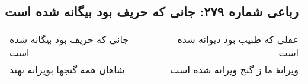 \begin{center}
\section*{رباعی شماره ۲۷۹: جانی که حریف بود بیگانه شده است}
\label{sec:0279}
\begin{longtable}{l p{0.5cm} r}
جانی که حریف بود بیگانه شده است
&&
عقلی که طبیب بود دیوانه شده است
\\
شاهان همه گنجها بویرانه نهند
&&
ویرانهٔ ما ز گنج ویرانه شده است
\\
\end{longtable}
\end{center}
